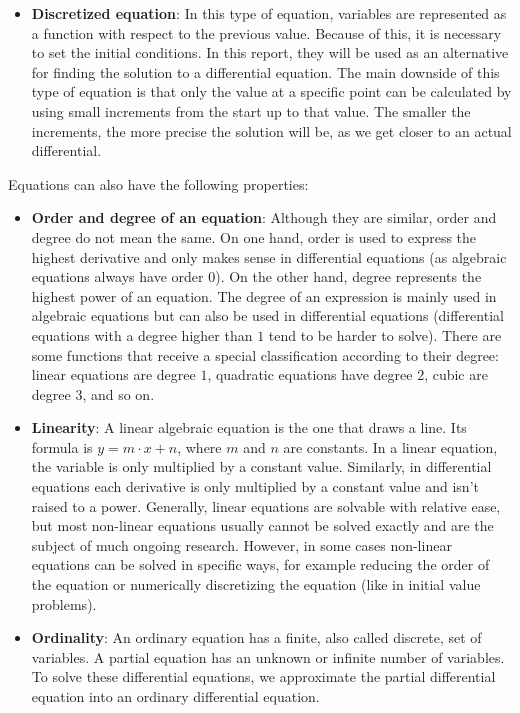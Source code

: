 \documentclass[12pt,twoside,a4paper]{article}
\begin{document}
\begin{itemize}
		\item \textbf{Discretized equation}: In this type of equation, variables are represented as a function with respect to the previous value. Because of this, it is necessary to set the initial conditions. In this report, they will be used as an alternative for finding the solution to a differential equation. The main downside of this type of equation is that only the value at a specific point can be calculated by using small increments from the start up to that value. The smaller the increments, the more precise the solution will be, as we get closer to an actual differential.
	\end{itemize}

	Equations can also have the following properties:
	\begin{itemize}
		\item \textbf{Order and degree of an equation}: Although they are similar, order and degree do not mean the same. On one hand, order is used to express the highest derivative and only makes sense in differential equations (as algebraic equations always have order $0$). On the other hand, degree represents the highest power of an equation. The degree of an expression is mainly used in algebraic equations but can also be used in differential equations (differential equations with a degree higher than $1$ tend to be harder to solve). There are some functions that receive a special classification according to their degree: linear equations are degree $1$, quadratic equations have degree $2$, cubic are degree $3$, and so on.
		
		\item \textbf{Linearity}: A linear algebraic equation is the one that draws a line. Its formula is $y = m \cdot x + n$, where $m$ and $n$ are constants. In a linear equation, the variable is only multiplied by a constant value. Similarly, in differential equations each derivative is only multiplied by a constant value and isn't raised to a power. Generally, linear equations are solvable with relative ease, but most non-linear equations usually cannot be solved exactly and are the subject of much ongoing research. However, in some cases non-linear equations can be solved in specific ways, for example reducing the order of the equation or numerically discretizing the equation (like in initial value problems).
		
		\item \textbf{Ordinality}: An ordinary equation has a finite, also called discrete, set of variables. A partial equation has an unknown or infinite number of variables. To solve these differential equations, we approximate the partial differential equation into an ordinary differential equation.
		

\end{itemize}
\end{document}
